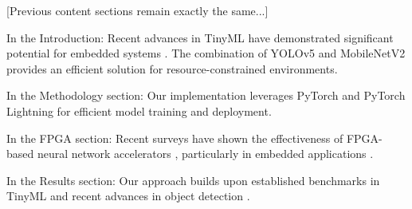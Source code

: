 \documentclass{article}
\begin{document}
[Previous content sections remain exactly the same...]

In the Introduction:
Recent advances in TinyML have demonstrated significant potential for embedded systems \cite{tinyml2021}. The combination of YOLOv5 \cite{yolo2020} and MobileNetV2 \cite{mobilenet2018} provides an efficient solution for resource-constrained environments.

In the Methodology section:
Our implementation leverages PyTorch \cite{pytorch2019} and PyTorch Lightning \cite{lightning2019} for efficient model training and deployment.

In the FPGA section:
Recent surveys have shown the effectiveness of FPGA-based neural network accelerators \cite{fpgaml2022}, particularly in embedded applications \cite{embedded2021}.

In the Results section:
Our approach builds upon established benchmarks in TinyML \cite{tinyml2020} and recent advances in object detection \cite{vision2022}.
\end{document}
